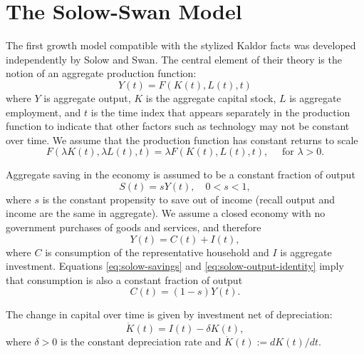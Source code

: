 \documentclass[\topdir/lecture\_notes.tex]{subfiles}
\begin{document}
\section{The Solow-Swan Model}

The first growth model compatible with the stylized Kaldor facts was developed independently by Solow and Swan.
The central element of their theory is the notion of an aggregate production function:
\begin{equation}
  Y(t)=F(K(t), L(t), t) \label{eq:solow-production-function}
\end{equation}
where \(Y\) is aggregate output, \(K\) is the aggregate capital stock, \(L\) is aggregate employment, and \(t\) is the time index that appears separately in the production function to indicate that other factors such as technology may not be constant over time.
We assume that the production function has constant returns to scale
\begin{equation}
  F(\lambda K(t), \lambda L(t), t)=\lambda F(K(t), L(t), t), \quad \text { for } \lambda>0. \label{eq:solow-constant-returns}
\end{equation}

Aggregate saving in the economy is assumed to be a constant fraction of output
\begin{equation}
  S(t)=s Y(t), \quad 0<s<1, \label{eq:solow-savings}
\end{equation}
where \(s\) is the constant propensity to save out of income (recall output and income are the same in aggregate).
We assume a closed economy with no government purchases of goods and services, and therefore
\begin{equation}
  Y(t)=C(t)+I(t), \label{eq:solow-output-identity}
\end{equation}
where \(C\) is consumption of the representative household and \(I\) is aggregate investment.
Equations \eqref{eq:solow-savings} and \eqref{eq:solow-output-identity} imply that consumption is also a constant fraction of output
\begin{equation}
  C(t)= (1-s) Y(t). \label{eq:solow-consumption}
\end{equation}

The change in capital over time is given by investment net of depreciation:
\begin{equation}
  \dot{K}(t)=I(t)-\delta K(t), \label{eq:solow-capital-accumulation}
\end{equation}
where \(\delta>0\) is the constant depreciation rate and \(\dot{K}(t) := dK(t) / dt\).
\end{document}
